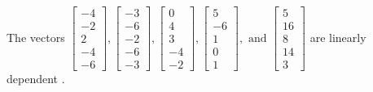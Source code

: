 \begin{exercise}
\begin{exerciseStatement}
  \end{exerciseStatement}
  \begin{exerciseAnswer}
   The vectors \(\left[\begin{array}{r}
-4 \\
-2 \\
2 \\
-4 \\
-6
\end{array}\right] , \left[\begin{array}{r}
-3 \\
-6 \\
-2 \\
-6 \\
-3
\end{array}\right] , \left[\begin{array}{r}
0 \\
4 \\
3 \\
-4 \\
-2
\end{array}\right] , \left[\begin{array}{r}
5 \\
-6 \\
1 \\
0 \\
1
\end{array}\right] , \text{ and } \left[\begin{array}{r}
5 \\
16 \\
8 \\
14 \\
3
\end{array}\right]\) are 
  	 linearly dependent  .
  


  \end{exerciseAnswer}
\end{exercise}